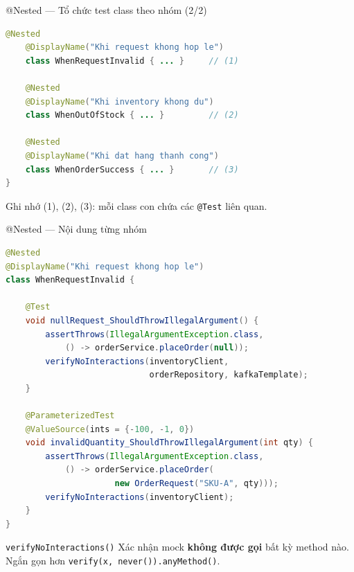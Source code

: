\documentclass[aspectratio=169,10pt]{beamer}
\begin{document}
\begin{frame}[fragile]{@Nested --- Tổ chức test class theo nhóm (2/2)}
\begin{lstlisting}[language=java]
    @Nested
    @DisplayName("Khi request khong hop le")
    class WhenRequestInvalid { ... }     // (1)

    @Nested
    @DisplayName("Khi inventory khong du")
    class WhenOutOfStock { ... }         // (2)

    @Nested
    @DisplayName("Khi dat hang thanh cong")
    class WhenOrderSuccess { ... }       // (3)
}
\end{lstlisting}

  \begin{block}{Ghi nhớ}
    (1), (2), (3): mỗi class con chứa các \texttt{@Test} liên quan.
  \end{block}
\end{frame}

\begin{frame}[fragile]{@Nested --- Nội dung từng nhóm}
\begin{lstlisting}[language=java]
@Nested
@DisplayName("Khi request khong hop le")
class WhenRequestInvalid {

    @Test
    void nullRequest_ShouldThrowIllegalArgument() {
        assertThrows(IllegalArgumentException.class,
            () -> orderService.placeOrder(null));
        verifyNoInteractions(inventoryClient,
                             orderRepository, kafkaTemplate);
    }

    @ParameterizedTest
    @ValueSource(ints = {-100, -1, 0})
    void invalidQuantity_ShouldThrowIllegalArgument(int qty) {
        assertThrows(IllegalArgumentException.class,
            () -> orderService.placeOrder(
                      new OrderRequest("SKU-A", qty)));
        verifyNoInteractions(inventoryClient);
    }
}
\end{lstlisting}

  \begin{block}{\texttt{verifyNoInteractions()}}
    Xác nhận mock \textbf{không được gọi} bất kỳ method nào.
    Ngắn gọn hơn \texttt{verify(x, never()).anyMethod()}.
  \end{block}
\end{frame}
\end{document}
